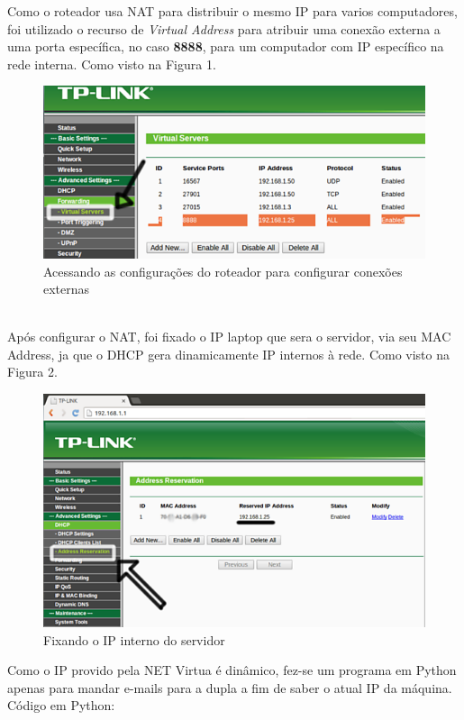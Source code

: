 \documentclass[10pt,a4paper]{report}
\begin{document}
Como o roteador usa NAT para distribuir o mesmo IP para varios computadores, foi utilizado o recurso de \textit{Virtual Address} para atribuir uma conexão externa a uma porta específica, no caso \textbf{8888}, para um computador com IP específico na rede interna. Como visto na Figura 1.
\begin{figure}[h!]
	\caption{Acessando as configurações do roteador para configurar conexões externas}
\includegraphics[width=\textwidth]{Imagens/u02.png}
\end{figure}
\\
Após configurar o NAT, foi fixado o IP laptop que sera o servidor, via seu MAC Address, ja que o DHCP gera dinamicamente IP internos à rede. Como visto na Figura 2.
\begin{figure}[h!]
	\caption{Fixando o IP interno do servidor}
\includegraphics[width=\textwidth]{Imagens/u01.png}
\end{figure}
\newpage
Como o IP provido pela NET Virtua é dinâmico, fez-se um programa em Python apenas para mandar e-mails para a dupla a fim de saber o atual IP da máquina.
\\
Código em Python:
\end{document}
